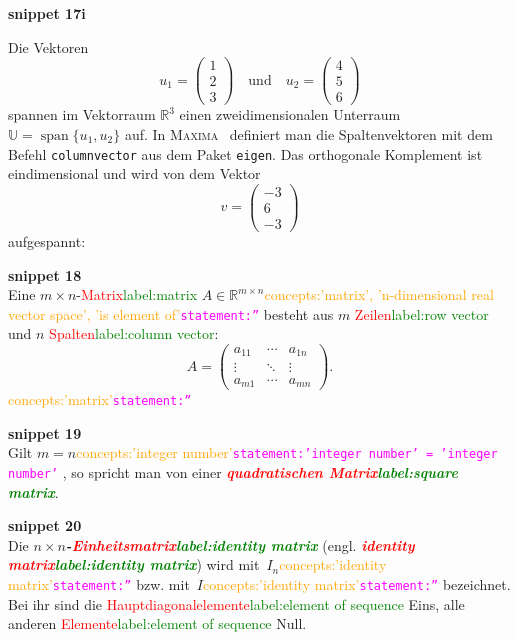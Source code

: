 \documentclass[a4paper,twoside,english,ngerman,deutsch,german,sectrefs,envcountsame,envcountchap]{svmono}
\newcommand{\setref}[2]{\textcolor{red}{#1}\textcolor{green}{#2}}
\newcommand{\snippet}[1]{\textbf{snippet #1}\\}
\newcommand{\eqnote}[2]{\textcolor{orange}{#1}\textcolor{magenta}{\texttt{#2}}}
\begin{document}
\snippet{17i}


\begin{example}
\label{exa:orthogonales-Komplement}Die Vektoren
\[
u_{1}=\left(\begin{array}{c} 1\\ 2\\ 3
\end{array}\right)\quad\text{und}\quad u_{2}=\left(\begin{array}{c}
4\\ 5\\ 6
\end{array}\right)
\]
spannen im Vektorraum ${\mathbb{R}}^{3}$ einen zweidimensionalen Unterraum $\mathbb{U}={\operatorname{span}}\{u_{1},u_{2}\}$ auf. In \textsc{Maxima}~\cite{maxima,haager2014} definiert man die Spaltenvektoren mit dem Befehl \texttt{columnvector} aus dem Paket \texttt{eigen}. Das orthogonale Komplement ist eindimensional und wird von dem Vektor
\[
v=\left(\begin{array}{c} -3\\ 6\\ -3
\end{array}\right)
\]
aufgespannt:


\end{example}


\snippet{18}
Eine $m\times n$-\setref{Matrix}{label:matrix} $A\in{\mathbb{R}}^{m\times n}$\eqnote{concepts:'matrix', 'n-dimensional real vector space', 'is element of'}{statement:''} besteht aus $m$ \setref{Zeilen}{label:row vector} und $n$ \setref{Spalten}{label:column vector}:
\[
A=\left(\begin{array}{ccc} a_{11} & \cdots & a_{1n}\\
\vdots & \ddots & \vdots\\
a_{m1} & \cdots & a_{mn}
\end{array}\right).
\]\eqnote{concepts:'matrix'}{statement:''}

\snippet{19}
Gilt $m=n$\eqnote{concepts:'integer number'}{statement:'integer number' = 'integer number'} , so spricht man von einer \textbf{\em \setref{quadratischen Matrix}{label:square matrix}}.

\snippet{20}
Die $n\times n$\textbf{\em -\setref{Einheitsmatrix}{label:identity matrix}} (engl. \textbf{\em \setref{identity matrix}{label:identity matrix}}) wird mit~$I_{n}$\eqnote{concepts:'identity matrix'}{statement:''} bzw. mit~$I$\eqnote{concepts:'identity matrix'}{statement:''} bezeichnet. Bei ihr sind die \setref{Hauptdiagonalelemente}{label:element of sequence} Eins, alle anderen \setref{Elemente}{label:element of sequence} Null.
\end{document}
